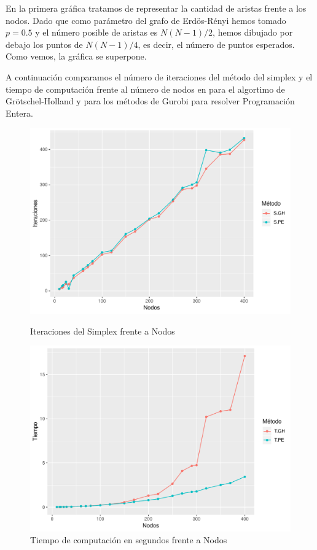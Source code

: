 \documentclass[twoside,a4paper,openright,12pt,tikz]{book}
\begin{document}
En la primera gráfica tratamos de representar la cantidad de aristas frente a los nodos. Dado que como parámetro del grafo de Erdös-Rényi hemos tomado $p=0.5$ y el número posible de aristas es $N(N-1)/2$, hemos dibujado por debajo los puntos de $N(N-1)/4$, es decir, el número de puntos esperados. Como vemos, la gráfica se superpone.

A continuación comparamos el número de iteraciones del método del simplex y el tiempo de computación frente al número de nodos en para el algortimo de Grötschel-Holland y para los métodos de Gurobi para resolver Programación Entera.

\begin{figure}[h!]
\centering
\includegraphics[scale=0.75]{plot2}
\caption{Iteraciones del Simplex frente a Nodos}
\includegraphics[scale=0.75]{plot3}
\caption{Tiempo de computación en segundos frente a Nodos}
\end{figure}
\end{document}
